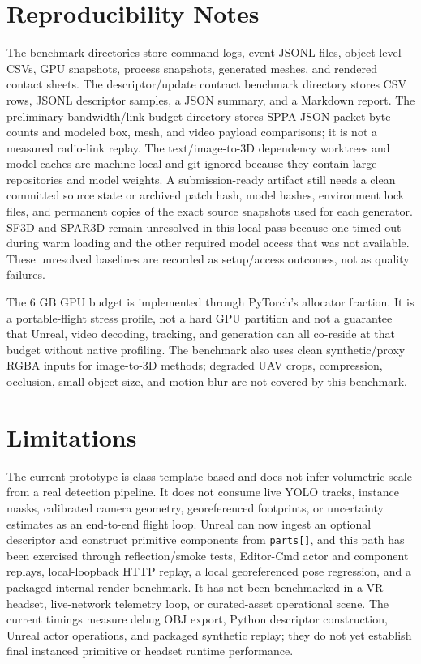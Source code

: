 ﻿\documentclass[11pt,a4paper]{article}
\begin{document}
\section{Reproducibility Notes}

The benchmark directories store command logs, event JSONL files, object-level
CSVs, GPU snapshots, process snapshots, generated meshes, and rendered contact
sheets. The descriptor/update contract benchmark directory stores CSV rows,
JSONL descriptor samples, a JSON summary, and a Markdown report. The
preliminary bandwidth/link-budget directory stores SPPA JSON packet byte counts
and modeled box, mesh, and video payload comparisons; it is not a measured
radio-link replay. The text/image-to-3D dependency worktrees and model caches are
machine-local and git-ignored because they contain large repositories and model
weights. A submission-ready artifact still needs a clean committed source state
or archived patch hash, model hashes, environment lock files, and permanent
copies of the exact source snapshots used for each generator. SF3D and SPAR3D remain unresolved in this
local pass because one timed out during warm loading and the other required
model access that was not available. These unresolved baselines are recorded as
setup/access outcomes, not as quality failures.

The 6 GB GPU budget is implemented through PyTorch's allocator fraction. It is a
portable-flight stress profile, not a hard GPU partition and not a guarantee
that Unreal, video decoding, tracking, and generation can all co-reside at that
budget without native profiling. The benchmark also uses clean synthetic/proxy
RGBA inputs for image-to-3D methods; degraded UAV crops, compression, occlusion,
small object size, and motion blur are not covered by this benchmark.

\section{Limitations}

The current prototype is class-template based and does not infer volumetric
scale from a real detection pipeline. It does not consume live YOLO tracks,
instance masks, calibrated camera geometry, georeferenced footprints, or
uncertainty estimates as an end-to-end flight loop. Unreal can now ingest an
optional descriptor and construct primitive components from \texttt{parts[]},
and this path has been exercised through reflection/smoke tests, Editor-Cmd
actor and component replays, local-loopback HTTP replay, a local georeferenced
pose regression, and a packaged internal render benchmark. It has not been benchmarked in a VR headset,
live-network telemetry loop, or curated-asset operational scene. The current
timings measure debug OBJ export, Python descriptor construction, Unreal actor
operations, and packaged synthetic replay; they do not yet establish final
instanced primitive or headset runtime performance.
\end{document}
